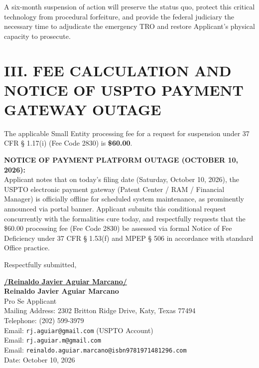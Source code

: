 \documentclass[11pt,letterpaper]{article}
\begin{document}
A six-month suspension of action will preserve the status quo, protect this critical technology from procedural forfeiture, and provide the federal judiciary the necessary time to adjudicate the emergency TRO and restore Applicant's physical capacity to prosecute.

\section*{III. FEE CALCULATION AND NOTICE OF USPTO PAYMENT GATEWAY OUTAGE}

The applicable Small Entity processing fee for a request for suspension under 37 CFR \S{} 1.17(i) (Fee Code 2830) is \textbf{\$60.00}.

\textbf{NOTICE OF PAYMENT PLATFORM OUTAGE (OCTOBER 10, 2026):} \\
Applicant notes that on today's filing date (Saturday, October 10, 2026), the USPTO electronic payment gateway (Patent Center / RAM / Financial Manager) is officially offline for scheduled system maintenance, as prominently announced via portal banner. Applicant submits this conditional request concurrently with the formalities cure today, and respectfully requests that the \$60.00 processing fee (Fee Code 2830) be assessed via formal Notice of Fee Deficiency under 37 CFR \S{} 1.53(f) and MPEP \S{} 506 in accordance with standard Office practice.

\vspace{0.3cm}
\begin{singlespace}
\noindent Respectfully submitted, \par\vspace{0.8cm}
\underline{\textbf{/Reinaldo Javier Aguiar Marcano/}} \\
\textbf{Reinaldo Javier Aguiar Marcano} \\
Pro Se Applicant \\
Mailing Address: 2302 Britton Ridge Drive, Katy, Texas 77494 \\
Telephone: (202) 599-3979 \\
Email: \texttt{rj.aguiar@gmail.com} (USPTO Account) \\
Email: \texttt{rj.aguiar.m@gmail.com} \\
Email: \texttt{reinaldo.aguiar.marcano@isbn9781971481296.com} \\
Date: October 10, 2026
\end{singlespace}
\end{document}
